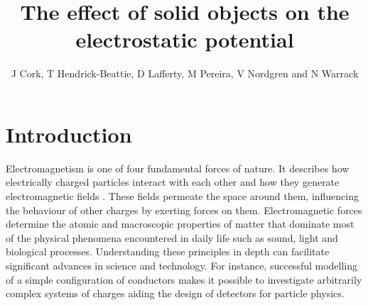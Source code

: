 \documentclass[a4paper]{jpconf}
\begin{document}
\title{The effect of solid objects on the electrostatic potential}
\author{J Cork, T  Hendrick-Beattie, D Lafferty, M Pereira, V Nordgren and N Warrack}
\address{School of Physics and Astronomy, University of Glasgow, Glasgow, UK}

\begin{abstract}
\end{abstract}

\section*{Introduction}
Electromagnetism is one of four fundamental forces of nature. It describes how electrically charged particles interact with each other and how they generate electromagnetic fields \cite{Sears.Zamansky-uniPhy}. These fields permeate the space around them, influencing the behaviour of other charges by exerting forces on them. %
Electromagnetic forces determine the atomic and macroscopic properties of matter that dominate most of the physical phenomena encountered in daily life such as sound, light and biological processes. Understanding these principles in depth can facilitate significant advances in science and technology. For instance, successful modelling of a simple configuration of conductors makes it possible to investigate arbitrarily complex systems of charges aiding the design of detectors for particle physics. 


\end{document}
